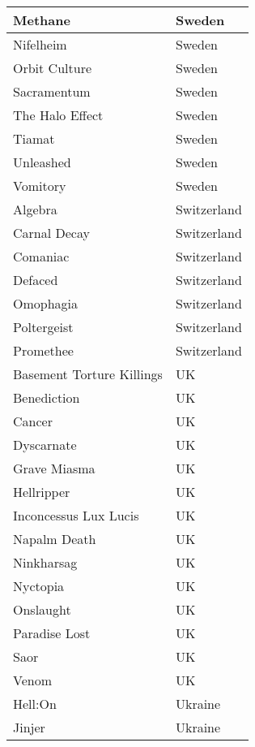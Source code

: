 \documentclass[12pt, a4paper, twoside]{report}
\begin{document}
\begin{center}
\begin{longtable}{|p{5cm}|p{5cm}|}
Methane & Sweden \\ \hline
Nifelheim & Sweden \\ \hline
Orbit Culture & Sweden \\ \hline
Sacramentum﻿ & Sweden \\ \hline
The Halo Effect & Sweden \\ \hline
Tiamat & Sweden \\ \hline
Unleashed & Sweden \\ \hline
Vomitory & Sweden \\ \hline
Algebra & Switzerland \\ \hline
Carnal Decay & Switzerland \\ \hline
Comaniac & Switzerland \\ \hline
Defaced & Switzerland \\ \hline
Omophagia & Switzerland \\ \hline
Poltergeist & Switzerland \\ \hline
Promethee & Switzerland \\ \hline
Basement Torture Killings & UK \\ \hline
Benediction & UK \\ \hline
Cancer & UK \\ \hline
Dyscarnate & UK \\ \hline
Grave Miasma & UK \\ \hline
Hellripper & UK \\ \hline
Inconcessus Lux Lucis & UK \\ \hline
Napalm Death & UK \\ \hline
Ninkharsag & UK \\ \hline
Nyctopia & UK \\ \hline
Onslaught & UK \\ \hline
Paradise Lost & UK \\ \hline
Saor & UK \\ \hline
Venom & UK \\ \hline
Hell:On & Ukraine \\ \hline
Jinjer & Ukraine \\ \hline
		\end{longtable}
	\end{center}
\end{document}

